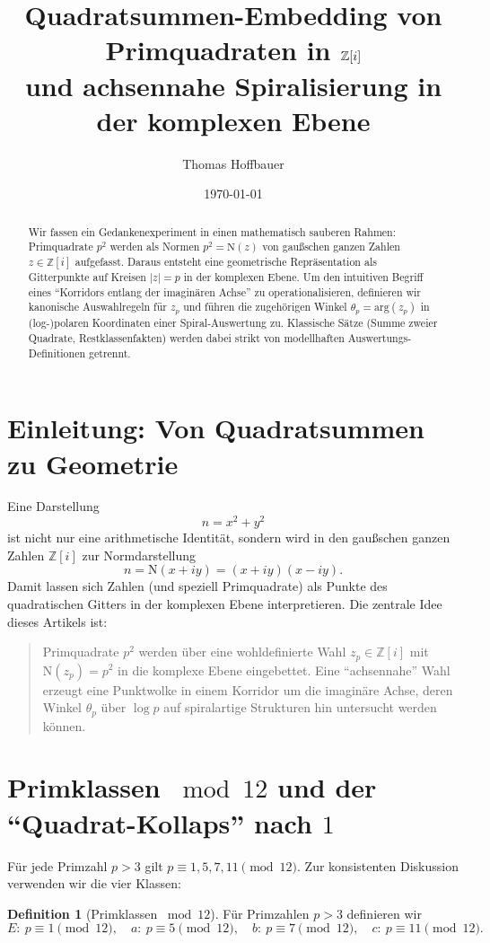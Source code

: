 \documentclass[a4paper,11pt]{article}
\title{\textbf{Quadratsummen-Embedding von Primquadraten in \(\Zi\)\\
		und achsennahe Spiralisierung in der komplexen Ebene}}
\author{Thomas Hoffbauer}
\date{\today}
\theoremstyle{definition}
\newtheorem{definition}[satz]{Definition}
\theoremstyle{remark}
\newcommand{\Zi}{\mathbb{Z}[i]}
\newcommand{\Norm}{\mathrm{N}}
\newcommand{\Arg}{\mathrm{arg}}
\begin{document}
	\maketitle
	
	\begin{abstract}
		Wir fassen ein Gedankenexperiment in einen mathematisch sauberen Rahmen: Primquadrate \(p^2\) werden als Normen
		\(p^2=\Norm(z)\) von gaußschen ganzen Zahlen \(z\in\Zi\) aufgefasst. Daraus entsteht eine geometrische Repräsentation
		als Gitterpunkte auf Kreisen \(|z|=p\) in der komplexen Ebene. Um den intuitiven Begriff eines ``Korridors entlang der
		imaginären Achse'' zu operationalisieren, definieren wir kanonische Auswahlregeln für \(z_p\) und führen die
		zugehörigen Winkel \(\theta_p=\Arg(z_p)\) in (log-)polaren Koordinaten einer Spiral-Auswertung zu. Klassische Sätze
		(Summe zweier Quadrate, Restklassenfakten) werden dabei strikt von modellhaften Auswertungs-Definitionen getrennt.
	\end{abstract}
	
	\tableofcontents
	
	\section{Einleitung: Von Quadratsummen zu Geometrie}
	Eine Darstellung
	\[
	n=x^2+y^2
	\]
	ist nicht nur eine arithmetische Identität, sondern wird in den gaußschen ganzen Zahlen \(\Zi\) zur Normdarstellung
	\[
	n=\Norm(x+iy)=(x+iy)(x-iy).
	\]
	Damit lassen sich Zahlen (und speziell Primquadrate) als Punkte des quadratischen Gitters in der komplexen Ebene
	interpretieren. Die zentrale Idee dieses Artikels ist:
	
	\begin{quote}
		Primquadrate \(p^2\) werden über eine wohldefinierte Wahl \(z_p\in\Zi\) mit \(\Norm(z_p)=p^2\) in die komplexe Ebene
		eingebettet. Eine ``achsennahe'' Wahl erzeugt eine Punktwolke in einem Korridor um die imaginäre Achse, deren Winkel
		\(\theta_p\) über \(\log p\) auf spiralartige Strukturen hin untersucht werden können.
	\end{quote}
	
	\section{Primklassen \(\bmod 12\) und der ``Quadrat-Kollaps'' nach \(1\)}
	Für jede Primzahl \(p>3\) gilt \(p\equiv 1,5,7,11\pmod{12}\). Zur konsistenten Diskussion verwenden wir die vier Klassen:
	\begin{definition}[Primklassen \(\bmod 12\)]
		Für Primzahlen \(p>3\) definieren wir
		\[
		E:\ p\equiv 1\!\!\pmod{12},\quad
		a:\ p\equiv 5\!\!\pmod{12},\quad
		b:\ p\equiv 7\!\!\pmod{12},\quad
		c:\ p\equiv 11\!\!\pmod{12}.
		\]
	\end{definition}
	
\end{document}
